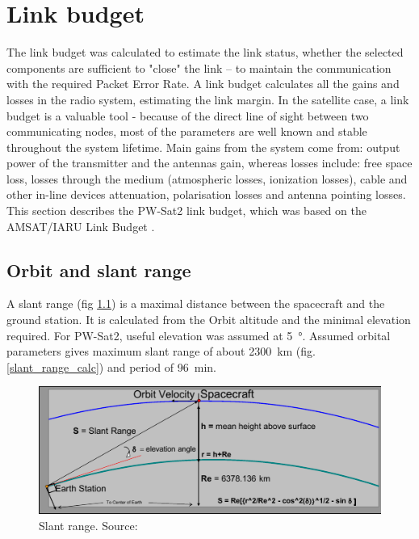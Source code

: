 \chapter{Link budget}
The link budget was calculated to estimate the link status, whether the selected components are sufficient to "close" the link – to maintain the communication with the required Packet Error Rate. A link budget calculates all the gains and losses in the radio system, estimating the link margin. In the satellite case, a link budget is a valuable tool - because of the direct line of sight between two communicating nodes, most of the parameters are well known and stable throughout the system lifetime. Main gains from the system come from: output power of the transmitter and the antennas gain, whereas losses include: free space loss, losses through the medium (atmospheric losses, ionization losses), cable and other in-line devices attenuation, polarisation losses and antenna pointing losses. This section describes the PW-Sat2 link budget, which was based on the AMSAT/IARU Link Budget \cite{amsat_link_budget}.

\section{Orbit and slant range}
A slant range (fig \ref{slant_range}) is a maximal distance between the spacecraft and the ground station. It is calculated from the Orbit altitude and the minimal elevation required. For PW-Sat2, useful elevation was assumed at \SI{5}{\degree}. Assumed orbital parameters gives maximum slant range of about \SI{2300}{\kilo\meter} (fig. \ref{slant_range_calc}) and period of \SI{96}{\minute}.

\begin{figure}
    \centering
    \includegraphics[width=0.8\paperwidth]{img/8/slant_range.pdf}
    \caption{Slant range. Source: \cite{amsat_link_budget}}
    \label{slant_range}
\end{figure}

